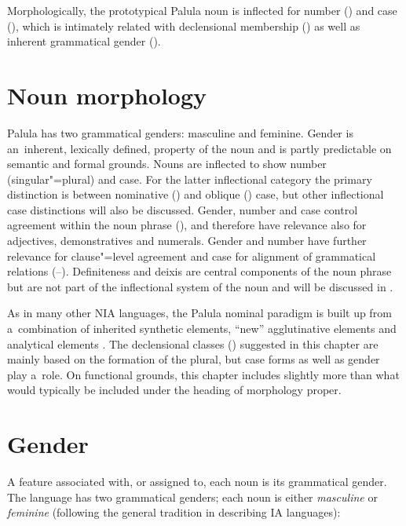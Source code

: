 Morphologically, the prototypical Palula noun is inflected for number () and case (), which is intimately related with declensional membership () as well as inherent grammatical gender (). 


\section{Noun morphology}
\label{sec:4-2}


Palula has two grammatical genders: masculine and feminine. Gender is an~inherent, lexically defined, property of the noun and is partly predictable on semantic and formal grounds. Nouns are inflected to show number (singular"=plural) and case. For the latter inflectional category the primary distinction is between nominative () and oblique () case, but other inflectional case distinctions will also be discussed. Gender, number and case control agreement within the noun phrase (), and therefore have relevance also for adjectives, demonstratives and numerals. Gender and number have further relevance for clause"=level agreement and case for alignment of grammatical relations (--). Definiteness and deixis are central components of the noun phrase but are not part of the inflectional system of the noun and will be discussed in .


As in many other NIA languages, the Palula nominal paradigm is built up from a~combination of inherited synthetic elements, ``new'' agglutinative elements and analytical elements \citep[212]{masica1991}. The declensional classes () suggested in this chapter are mainly based on the formation of the plural, but case forms as well as gender play a~role. On functional grounds, this chapter includes slightly more than what would typically be included under the heading of morphology proper.


\section{Gender}
\label{sec:4-3}

A feature associated with, or assigned to, each noun is its grammatical gender. The language has two grammatical genders; each noun is either \textit{masculine} or \textit{feminine} (following the general tradition in describing IA languages): 


